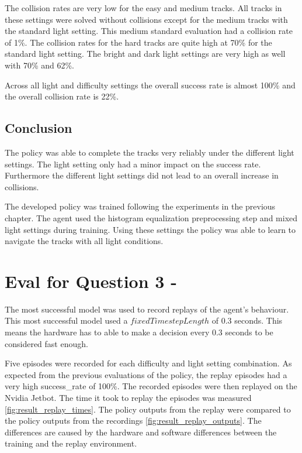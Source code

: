 The collision rates are very low for the easy and medium tracks. All tracks in these settings were solved without collisions except for the medium tracks with the standard light setting. This medium standard evaluation had a collision rate of 1\%.
The collision rates for the hard tracks are quite high at 70\% for the standard light setting. The bright and dark light settings are very high as well with 70\% and 62\%.

Across all light and difficulty settings the overall success rate is almost 100\% and the overall collision rate is 22\%.

\subsection{Conclusion}

The policy was able to complete the tracks very reliably under the different light settings. The light setting only had a minor impact on the success rate.
Furthermore the different light settings did not lead to an overall increase in collisions.

The developed policy was trained following the experiments in the previous chapter. The agent used the histogram equalization preprocessing step and mixed light settings during training. Using these settings the policy was able to learn to navigate the tracks with all light conditions.


\section{Eval for Question 3 - \questionThree}

The most successful model was used to record replays of the agent's behaviour. This most successful model used a $fixedTimestepLength$ of $0.3$ seconds. This means the hardware has to able to make a decision every $0.3$ seconds to be considered fast enough.

Five episodes were recorded for each difficulty and light setting combination. As expected from the previous evaluations of the policy, the replay episodes had a very high success\_rate of 100\%. The recorded episodes were then replayed on the Nvidia Jetbot. The time it took to replay the episodes was measured \ref{fig:result_replay_times}. The policy outputs from the replay were compared to the policy outputs from the recordings \ref{fig:result_replay_outputs}. The differences are caused by the hardware and software differences between the training and the replay environment.


